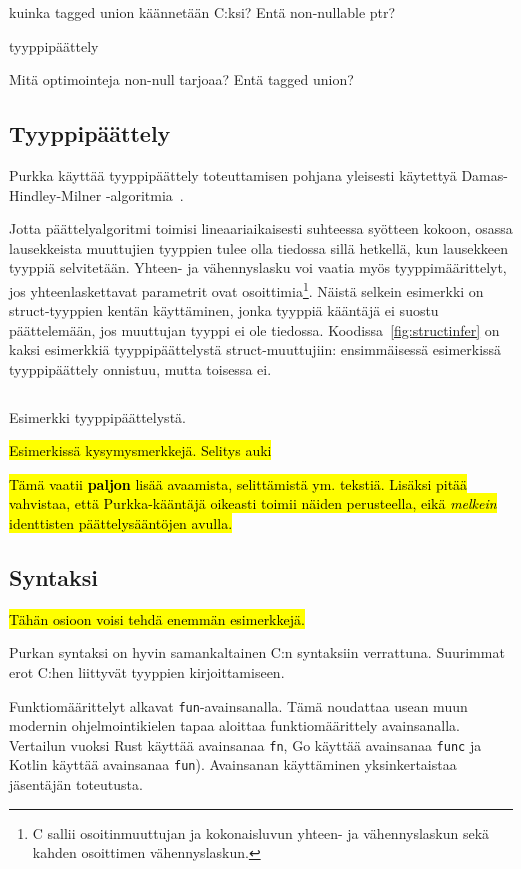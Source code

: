 kuinka tagged union käännetään C:ksi? Entä non-nullable ptr?

tyyppipäättely

Mitä optimointeja non-null tarjoaa? Entä tagged union?

\subsection{Tyyppipäättely}

Purkka käyttää tyyppipäättely toteuttamisen pohjana yleisesti käytettyä
Damas-Hindley-Milner -algoritmia~\citep{hindley, milner, damas}.

Jotta päättelyalgoritmi toimisi lineaariaikaisesti suhteessa syötteen kokoon,
osassa lausekkeista muuttujien tyyppien tulee olla tiedossa sillä hetkellä, kun
lausekkeen tyyppiä selvitetään. Yhteen- ja vähennyslasku voi vaatia myös
tyyppimäärittelyt, jos yhteenlaskettavat parametrit ovat osoittimia\footnote{C
sallii osoitinmuuttujan ja kokonaisluvun yhteen- ja vähennyslaskun sekä kahden
osoittimen vähennyslaskun.}. Näistä selkein esimerkki on struct-tyyppien kentän
käyttäminen, jonka tyyppiä kääntäjä ei suostu päättelemään, jos muuttujan
tyyppi ei ole tiedossa. Koodissa~\ref{fig:structinfer} on kaksi esimerkkiä
tyyppipäättelystä struct-muuttujiin: ensimmäisessä esimerkissä
tyyppipäättely onnistuu, mutta toisessa ei.

\begin{listing}[ht!]
    \inputminted{Rust}{koodi/infer.prk}
    \caption{Esimerkki tyyppipäättelystä.}
    \label{fig:structinfer}
\end{listing}

\FloatBarrier

\hl {Esimerkissä kysymysmerkkejä. Selitys auki}

\hl{Tämä vaatii \textbf{paljon} lisää avaamista, selittämistä ym. tekstiä.
Lisäksi pitää vahvistaa, että Purkka-kääntäjä oikeasti toimii näiden
perusteella, eikä \emph{melkein} identtisten päättelysääntöjen avulla.}

\subsection{Syntaksi}

\hl{Tähän osioon voisi tehdä enemmän esimerkkejä.}

Purkan syntaksi on hyvin samankaltainen C:n syntaksiin verrattuna. Suurimmat
erot C:hen liittyvät tyyppien kirjoittamiseen.

Funktiomäärittelyt alkavat \texttt{fun}-avainsanalla. Tämä noudattaa usean muun
modernin ohjelmointikielen tapaa aloittaa funktiomäärittely avainsanalla.
Vertailun vuoksi Rust käyttää avainsanaa \texttt{fn}, Go käyttää avainsanaa
\texttt{func} ja Kotlin käyttää avainsanaa \texttt{fun}). Avainsanan
käyttäminen yksinkertaistaa jäsentäjän toteutusta.

